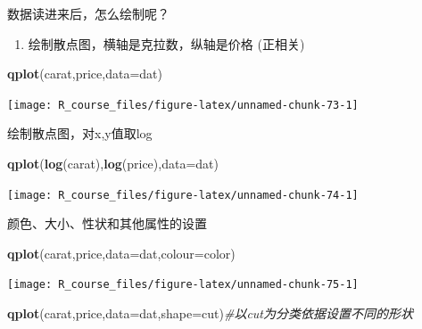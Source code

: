 \documentclass[]{article}
\newenvironment{Shaded}{\begin{snugshade}}{\end{snugshade}}
\newcommand{\KeywordTok}[1]{\textcolor[rgb]{0.13,0.29,0.53}{\textbf{{#1}}}}
\newcommand{\DataTypeTok}[1]{\textcolor[rgb]{0.13,0.29,0.53}{{#1}}}
\newcommand{\CommentTok}[1]{\textcolor[rgb]{0.56,0.35,0.01}{\textit{{#1}}}}
\newcommand{\NormalTok}[1]{{#1}}
\providecommand{\tightlist}{%
  \setlength{\itemsep}{0pt}\setlength{\parskip}{0pt}}
\numberwithin{figure}{section}
\numberwithin{table}{section}
\theoremstyle{definition}
\theoremstyle{definition}
\theoremstyle{definition}
\theoremstyle{remark}
\begin{document}
数据读进来后，怎么绘制呢？

\begin{enumerate}
\def\labelenumi{\arabic{enumi}.}
\tightlist
\item
  绘制散点图，横轴是克拉数，纵轴是价格 (正相关)
\end{enumerate}

\begin{Shaded}
\begin{Highlighting}[]
\KeywordTok{qplot}\NormalTok{(carat,price,}\DataTypeTok{data=}\NormalTok{dat)}
\end{Highlighting}
\end{Shaded}

\begin{center}\texttt{[image: R\_course\_files/figure-latex/unnamed-chunk-73-1]} \end{center}

绘制散点图，对x,y值取log

\begin{Shaded}
\begin{Highlighting}[]
\KeywordTok{qplot}\NormalTok{(}\KeywordTok{log}\NormalTok{(carat),}\KeywordTok{log}\NormalTok{(price),}\DataTypeTok{data=}\NormalTok{dat)}
\end{Highlighting}
\end{Shaded}

\begin{center}\texttt{[image: R\_course\_files/figure-latex/unnamed-chunk-74-1]} \end{center}

颜色、大小、性状和其他属性的设置

\begin{Shaded}
\begin{Highlighting}[]
\KeywordTok{qplot}\NormalTok{(carat,price,}\DataTypeTok{data=}\NormalTok{dat,}\DataTypeTok{colour=}\NormalTok{color)}
\end{Highlighting}
\end{Shaded}

\begin{center}\texttt{[image: R\_course\_files/figure-latex/unnamed-chunk-75-1]} \end{center}

\begin{Shaded}
\begin{Highlighting}[]
\KeywordTok{qplot}\NormalTok{(carat,price,}\DataTypeTok{data=}\NormalTok{dat,}\DataTypeTok{shape=}\NormalTok{cut)}\CommentTok{#以cut为分类依据设置不同的形状}
\end{Highlighting}
\end{Shaded}
\end{document}
